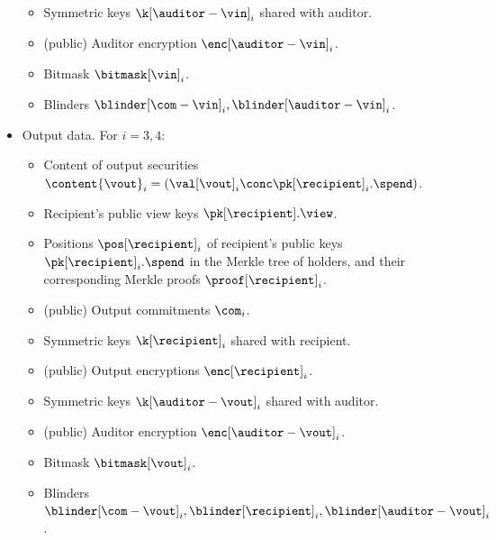 \begin{itemize}
\begin{itemize}
		\item Symmetric keys $\k[\auditor-\vin]_i$ shared with auditor. 
		\item (public) Auditor encryption $\enc[\auditor-\vin]_i$.
		\item Bitmask $\bitmask[\vin]_i$.
		\item Blinders $\blinder[\com-\vin]_i, \blinder[\auditor-\vin]_i$.
	\end{itemize}
	\item Output data. For $i=3,4$:
	\begin{itemize}
		\item Content of output securities $\content{\vout}_i = (\val[\vout]_i \conc \pk[\recipient]_i.\spend)$.
		\item Recipient's public view keys $\pk[\recipient].\view$.
		\item Positions $\pos[\recipient]_i$ of recipient's public keys $\pk[\recipient]_i.\spend$ in the Merkle tree of holders, and their corresponding Merkle proofs $\proof[\recipient]_i$.
		\item (public) Output commitments $\com_i$.
		\item Symmetric keys $\k[\recipient]_i$ shared with recipient. 
		\item (public) Output encryptions $\enc[\recipient]_i$.
		\item Symmetric keys $\k[\auditor-\vout]_i$ shared with auditor. 
		\item (public) Auditor encryption $\enc[\auditor-\vout]_i$.
		\item Bitmask $\bitmask[\vout]_i$.
		\item Blinders $\blinder[\com-\vout]_i, \blinder[\recipient]_i, \blinder[\auditor-\vout]_i$.
	\end{itemize}
\end{itemize}

